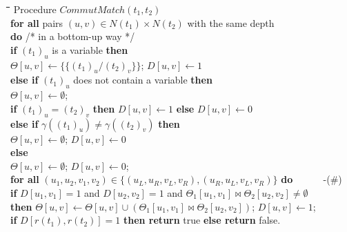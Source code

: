 \documentclass[a4paper]{llncs}
\begin{document}
\begin{rm}
\begin{tabbing}
\quad \= \quad \= \quad \= \quad \= \quad \= \quad \= \quad \= \kill
\> Procedure $CommutMatch(t_1,t_2)$\\
\> \> {\bf for all} pairs $(u,v) \in N(t_1) \times N(t_2)$ with the same depth\\
\> \> {\bf do} \hspace{6cm} /* in a bottom-up way */ \\
\> \> \> {\bf if} $(t_1)_u$ is a variable {\bf then} \\
\> \> \> \> $\Theta[u,v] \leftarrow \{ \{(t_1)_u/(t_2)_v\} \}$;
$D[u,v] \leftarrow 1$ \\
\> \> \> {\bf else if} $(t_1)_u$ does not contain a variable {\bf then}\\ 
\> \> \> \> $\Theta[u,v] \leftarrow \emptyset$; \\
\> \> \> \> {\bf if} $(t_1)_u = (t_2)_v$ {\bf then} $D[u,v] \leftarrow 1$
{\bf else} $D[u,v] \leftarrow 0$ \\
\> \> \> {\bf else if} $\gamma((t_1)_u) \neq \gamma((t_2)_v)$ {\bf then}\\
\> \> \> \> $\Theta[u,v] \leftarrow \emptyset$; $D[u,v] \leftarrow 0$ \\
\> \> \> {\bf else} \\
\> \> \> \> $\Theta[u,v] \leftarrow \emptyset$; $D[u,v] \leftarrow 0$; \\
\> \> \> \> {\bf for all} $(u_1,u_2,v_1,v_2) \in
\{ (u_L,u_R,v_L,v_R), (u_R,u_L,v_L,v_R) \}$ {\bf do} ~~~~~ -(\#)\\
\> \> \> \> \> {\bf if} $D[u_1,v_1]=1$ and $D[u_2,v_2]=1$ and
$\Theta_1[u_1,v_1] \Join \Theta_2[u_2,v_2] \neq \emptyset$\\
\> \> \> \> \> {\bf then} $\Theta[u,v] \leftarrow \Theta[u,v] \cup 
(\Theta_1[u_1,v_1] \Join \Theta_2[u_2,v_2])$;
$D[u,v] \leftarrow 1$;\\
\> \> {\bf if} $D[r(t_1),r(t_2)]=1$ {\bf then return} true {\bf else return} false.
\end{tabbing}
\end{rm}
\end{document}
